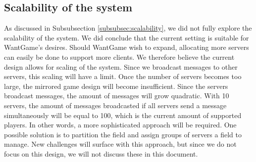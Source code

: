 	\subsection{Scalability of the system}
	\label{subsec:scalability_system_discussion}
		As discussed in Subsubsection \ref{subsubsec:scalability}, we did not fully explore the scalability of the system. 
		We did conclude that the current setting is suitable for WantGame's desires. 
		Should WantGame wish to expand, allocating more servers can easily be done to support more clients. 
		We therefore believe the current design allows for scaling of the system.
		Since we broadcast messages to other servers, this scaling will have a limit. 
		Once the number of servers becomes too large, the mirrored game design will become insufficient.
		Since the servers broadcast messages, the amount of messages will grow quadratic. 
		With 10 servers, the amount of messages broadcasted if all servers send a message simultaneously will be equal to 100, which is the current amount of supported players.
		In other words, a more sophisticated approach will be required. 
		One possible solution is to partition the field and assign groups of servers a field to manage. 
		New challenges will surface with this approach, but since we do not focus on this design, we will not discuss these in this document.